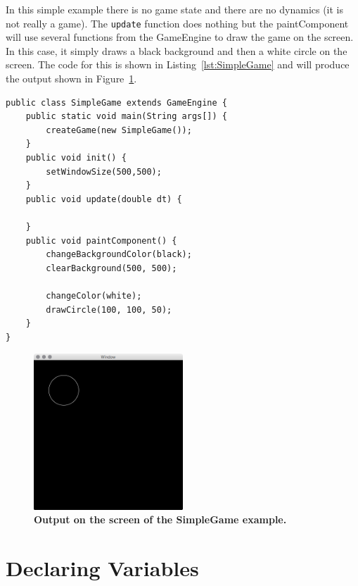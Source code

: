 \documentclass[a4paper, 10pt]{report}
\begin{document}
In this simple example there is no game state and there are no dynamics (it is not really a game). The {\tt update} function does nothing but the paintComponent will use several functions from the GameEngine to draw the game on the screen. In this case, it simply draws a black background and then a white circle on the screen. The code for this is shown in Listing~\ref{lst:SimpleGame} and will produce the output shown in Figure~\ref{fig:SimpleGame}.

\begin{lstlisting}[caption=Initialisation function for SimpleGame., label=lst:SimpleGame]
public class SimpleGame extends GameEngine {
    public static void main(String args[]) {
        createGame(new SimpleGame());
    }
    public void init() {
        setWindowSize(500,500);
    }
    public void update(double dt) {
        
    }
    public void paintComponent() {
        changeBackgroundColor(black);
        clearBackground(500, 500);

        changeColor(white);
        drawCircle(100, 100, 50);
    }
}
\end{lstlisting}

\begin{figure}[htbp]
\begin{center}
\includegraphics[width=0.5\textwidth]{SimpleGame}
\caption{{\bf Output on the screen of the SimpleGame example.}}
\label{fig:SimpleGame}
\end{center}
\end{figure}

\section*{Declaring Variables} \nonumber
\end{document}
